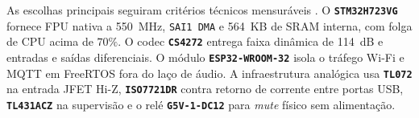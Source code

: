 \documentclass[12pt,openright,oneside,a4paper,brazil]{abntex2}
\begin{document}
As escolhas principais seguiram critérios técnicos mensuráveis \cite{ifpb2026roteiro}. O \textbf{\texttt{STM32H723VG}} \cite{st2023stm32h723, weact2022stm32h723} fornece FPU nativa a 550~MHz, \texttt{SAI1 DMA} e 564~KB de SRAM interna, com folga de CPU acima de $70\%$. O codec \textbf{\texttt{CS4272}} \cite{cirrus2015cs4272} entrega faixa dinâmica de 114~dB e entradas e saídas diferenciais. O módulo \textbf{\texttt{ESP32-WROOM-32}} \cite{espressif2023esp32} isola o tráfego Wi-Fi e MQTT em FreeRTOS fora do laço de áudio. A infraestrutura analógica usa \textbf{\texttt{TL072}} \cite{ti2015tl072} na entrada JFET Hi-Z, \textbf{\texttt{ISO7721DR}} \cite{ti2020iso7721} contra retorno de corrente entre portas USB, \textbf{\texttt{TL431ACZ}} \cite{ti2018tl431} na supervisão e o relé \textbf{\texttt{G5V-1-DC12}} \cite{omron2020g5v1} para \textit{mute} físico sem alimentação.
\end{document}
